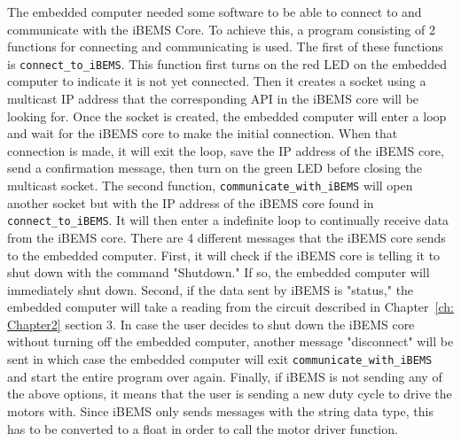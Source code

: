 The embedded computer needed some software to be able to connect to and communicate with the iBEMS Core. To achieve this, a program consisting of 2 functions for connecting and communicating is used.
\medbreak
The first of these functions is \texttt{connect\_to\_iBEMS}. This function first turns on the red LED on the embedded computer to indicate it is not yet connected. Then it creates a socket using a multicast IP address that the corresponding API in the iBEMS core will be looking for. Once the socket is created, the embedded computer will enter a loop and wait for the iBEMS core to make the initial connection. When that connection is made, it will exit the loop, save the IP address of the iBEMS core, send a confirmation message, then turn on the green LED before closing the multicast socket.
\medbreak
The second function, \texttt{communicate\_with\_iBEMS} will open another socket but with the IP address of the iBEMS core found in \texttt{connect\_to\_iBEMS}. It will then enter a indefinite loop to continually receive data from the iBEMS core. There are 4 different messages that the iBEMS core sends to the embedded computer. First, it will check if the iBEMS core is telling it to shut down with the command "Shutdown." If so, the embedded computer will immediately shut down. Second, if the data sent by iBEMS is "status," the embedded computer will take a reading from the circuit described in Chapter~\ref{ch: Chapter2} section 3. In case the user decides to shut down the iBEMS core without turning off the embedded computer, another message "disconnect" will be sent in which case the embedded computer will exit \texttt{communicate\_with\_iBEMS} and start the entire program over again. Finally, if iBEMS is not sending any of the above options, it means that the user is sending a new duty cycle to drive the motors with. Since iBEMS only sends messages with the string data type, this has to be converted to a float in order to call the motor driver function. 


